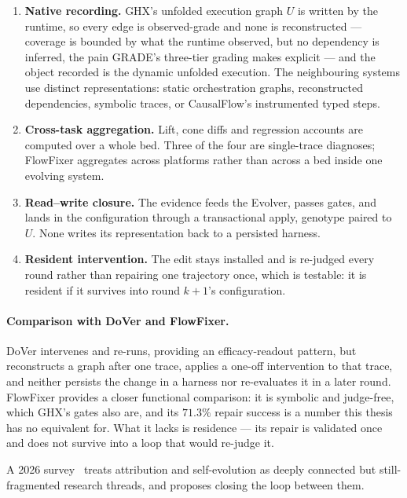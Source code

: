 \begin{enumerate}
  \item \textbf{Native recording.} GHX's unfolded execution graph $U$ is
        written by the runtime, so every edge is observed-grade and none is
        reconstructed --- coverage is bounded by what the runtime observed,
        but no dependency is inferred, the pain GRADE's three-tier grading
        makes explicit --- and the object recorded is the dynamic unfolded execution. The neighbouring
        systems use distinct representations: static orchestration graphs,
        reconstructed dependencies, symbolic traces, or CausalFlow's instrumented
        typed steps.
  \item \textbf{Cross-task aggregation.} Lift, cone diffs and regression
        accounts are computed over a whole bed. Three of the four are
        single-trace diagnoses; FlowFixer aggregates across platforms
        rather than across a bed inside one evolving system.
  \item \textbf{Read--write closure.} The evidence feeds the Evolver,
        passes gates, and lands in the configuration through a
        transactional apply, genotype paired to $U$. None writes its representation back to a persisted harness.
  \item \textbf{Resident intervention.} The edit stays installed and is
        re-judged every round rather than repairing one trajectory once,
        which is testable: it is resident if it survives into round
        $k{+}1$'s configuration.
\end{enumerate}

\paragraph{Comparison with DoVer and FlowFixer.} DoVer intervenes and
re-runs, providing an efficacy-readout pattern, but reconstructs a graph
after one trace, applies a one-off intervention to that trace, and neither
persists the change in a harness nor re-evaluates it in a later round.
FlowFixer provides a closer functional comparison: it is symbolic and judge-free, which
GHX's gates also are, and its $71.3\%$ repair success is a number this
thesis has no equivalent for. What it lacks is residence --- its repair is
validated once and does not survive into a loop that would re-judge it.

A 2026 survey~\cite{survey-attr-evolve} treats attribution and
self-evolution as deeply connected but still-fragmented research threads,
and proposes closing the loop between them.


